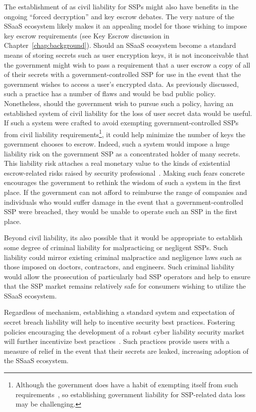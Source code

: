 The establishment of as civil liability for SSPs might also have
benefits in the ongoing ``forced decryption'' and key escrow
debates. The very nature of the SSaaS ecosystem likely makes it an
appealing model for those wishing to impose key escrow requirements
(see Key Escrow discussion in Chapter~\ref{chap:background}). Should
an SSaaS ecosystem become a standard means of storing secrets such as
user encryption keys, it is not inconceivable that the government
might wish to pass a requirement that a user escrow a copy of all of
their secrets with a government-controlled SSP for use in the event
that the government wishes to access a user's encrypted data. As
previously discussed, such a practice has a number of flaws and would
be bad public policy. Nonetheless, should the government wish to
pursue such a policy, having an established system of civil liability
for the loss of user secret data would be useful. If such a system
were crafted to avoid exempting government-controlled SSPs from civil
liability requirements\footnote{Although the government does have a
  habit of exempting itself from such requirements~\cite{sisk2011}, so
  establishing government liability for SSP-related data loss may be
  challenging.}, it could help minimize the number of keys the
government chooses to escrow. Indeed, such a system would impose a
huge liability risk on the government SSP as a concentrated holder of
many secrets. This liability risk attaches a real monetary value to
the kinds of existential escrow-related risks raised by security
professional~\cite{abelson2015}. Making such fears concrete encourages
the government to rethink the wisdom of such a system in the first
place. If the government can not afford to reimburse the range of
companies and individuals who would suffer damage in the event that a
government-controlled SSP were breached, they would be unable to
operate such an SSP in the first place.

Beyond civil liability, its also possible that it would be appropriate
to establish some degree of criminal liability for malpracticing or
negligent SSPs. Such liability could mirror existing criminal
malpractice and negligence laws such as those imposed on doctors,
contractors, and engineers. Such criminal liability would allow the
prosecution of particularly bad SSP operators and help to ensure that
the SSP market remains relatively safe for consumers wishing to
utilize the SSaaS ecosystem.

Regardless of mechanism, establishing a standard system and
expectation of secret breach liability will help to incentive security
best practices. Fostering policies encouraging the development of a
robust cyber liability security market will further incentivize best
practices~\cite{starks2016}. Such practices provide users with a
measure of relief in the event that their secrets are leaked,
increasing adoption of the SSaaS ecosystem.

